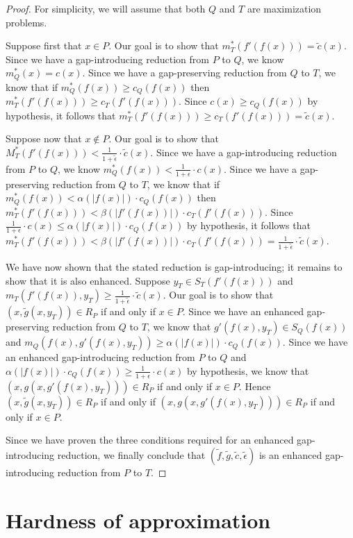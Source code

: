 \documentclass[]{article}
\theoremstyle{plain}
\theoremstyle{definition}
\begin{document}
\begin{proof}
  For simplicity, we will assume that both $Q$ and $T$ are maximization problems.

  Suppose first that $x \in P$.
  Our goal is to show that $m^*_T(f'(f(x))) = \tilde{c}(x)$.
  Since we have a gap-introducing reduction from $P$ to $Q$, we know $m^*_Q(x) = c(x)$.
  Since we have a gap-preserving reduction from $Q$ to $T$, we know that if $m^*_Q(f(x)) \geq c_Q(f(x))$ then $m^*_T(f'(f(x))) \geq c_T(f'(f(x)))$.
  Since $c(x) \geq c_Q(f(x))$ by hypothesis, it follows that $m^*_T(f'(f(x))) \geq c_T(f'(f(x))) = \tilde{c}(x)$.

  Suppose now that $x \notin P$.
  Our goal is to show that $M^*_T(f'(f(x))) < \frac{1}{1 + \tilde{\epsilon}} \cdot \tilde{c}(x)$.
  Since we have a gap-introducing reduction from $P$ to $Q$, we know $m^*_Q(f(x)) < \frac{1}{1 + \epsilon} \cdot c(x)$.
  Since we have a gap-preserving reduction from $Q$ to $T$, we know that if $m^*_Q(f(x)) < \alpha(|f(x)|) \cdot c_Q(f(x))$ then $m^*_T(f'(f(x))) < \beta(|f'(f(x))|) \cdot c_T(f'(f(x)))$.
  Since $\frac{1}{1 + \epsilon} \cdot c(x) \leq \alpha(|f(x)|) \cdot c_Q(f(x))$ by hypothesis, it follows that $m^*_T(f'(f(x))) < \beta(|f'(f(x))|) \cdot c_T(f'(f(x))) = \frac{1}{1 + \tilde{\epsilon}} \cdot \tilde{c}(x)$.

  We have now shown that the stated reduction is gap-introducing; it remains to show that it is also enhanced.
  Suppose $y_T \in S_T(f'(f(x)))$ and $m_T(f'(f(x)), y_T) \geq \frac{1}{1 + \tilde{\epsilon}} \cdot \tilde{c}(x)$.
  Our goal is to show that $(x, \tilde{g}(x, y_T)) \in R_P$ if and only if $x \in P$.
  Since we have an enhanced gap-preserving reduction from $Q$ to $T$, we know that $g'(f(x), y_T) \in S_Q(f(x))$ and $m_Q(f(x), g'(f(x), y_T)) \geq \alpha(|f(x)|) \cdot c_Q(f(x))$.
  Since we have an enhanced gap-introducing reduction from $P$ to $Q$ and $\alpha(|f(x)|) \cdot c_Q(f(x)) \geq \frac{1}{1 + \epsilon} \cdot c(x)$ by hypothesis, we know that $(x, g(x, g'(f(x), y_T))) \in R_P$ if and only if $x \in P$.
  Hence $(x, \tilde{g}(x, y_T)) \in R_P$ if and only if $(x, g(x, g'(f(x), y_T))) \in R_P$ if and only if $x \in P$.

  Since we have proven the three conditions required for an enhanced gap-introducing reduction, we finally conclude that $(\tilde{f}, \tilde{g}, \tilde{c}, \tilde{\epsilon})$ is an enhanced gap-introducing reduction from $P$ to $T$.
\end{proof}

\section{Hardness of approximation}
\end{document}

